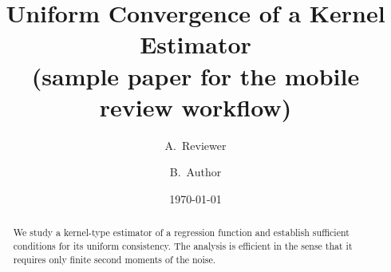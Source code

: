 \documentclass[11pt]{article}
\title{Uniform Convergence of a Kernel Estimator\\ \large (sample paper for the mobile review workflow)}
\author{A.~Reviewer \and B.~Author}
\date{\today}
\begin{document}
\maketitle

\begin{abstract}
We study a kernel-type estimator of a regression function and establish
sufficient conditions for its uniform consistency. The analysis is
efficient in the sense that it requires only finite second moments of
the noise.
\end{abstract}







\end{document}
